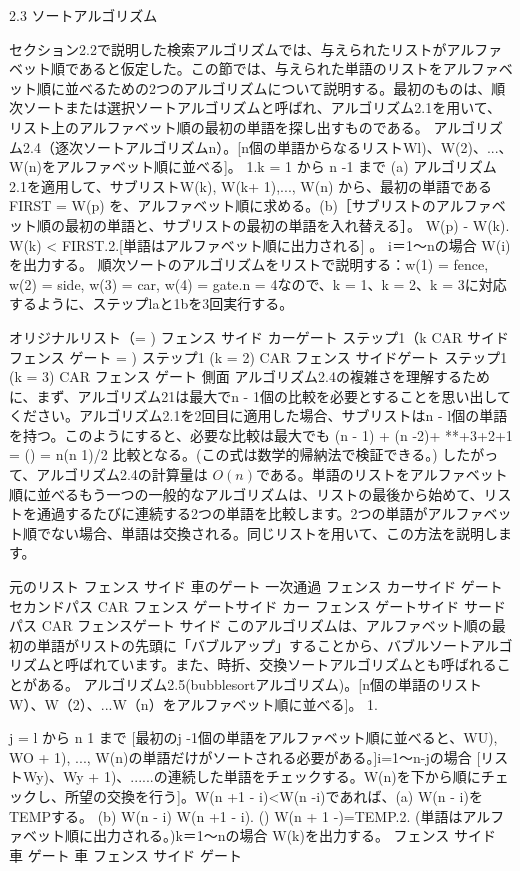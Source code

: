 

2.3 ソートアルゴリズム

セクション2.2で説明した検索アルゴリズムでは、与えられたリストがアルファベット順であると仮定した。この節では、与えられた単語のリストをアルファベット順に並べるための2つのアルゴリズムについて説明する。最初のものは、順次ソートまたは選択ソートアルゴリズムと呼ばれ、アルゴリズム2.1を用いて、リスト上のアルファベット順の最初の単語を探し出すものである。
アルゴリズム2.4（逐次ソートアルゴリズムn）。[n個の単語からなるリストWl)、W(2)、...、W(n)をアルファベット順に並べる]。
1.k = 1 から n -1 まで
(a) アルゴリズム2.1を適用して、サブリストW(k), W(k+ 1),..., W(n) から、最初の単語であるFIRST = W(p) を、アルファベット順に求める。(b)［サブリストのアルファベット順の最初の単語と、サブリストの最初の単語を入れ替える］。
W(p) - W(k).
W(k) < FIRST.2.[単語はアルファベット順に出力される] 。
i＝1〜nの場合
W(i)を出力する。
順次ソートのアルゴリズムをリストで説明する：w(1) = fence, w(2) = side, w(3) = car, w(4) = gate.n = 4なので、k = 1、k = 2、k = 3に対応するように、ステップlaと1bを3回実行する。


オリジナルリスト（= )
フェンス
サイド
カーゲート
ステップ1（k
CAR
サイドフェンス
ゲート
= )
ステップ1 (k = 2)
CAR
フェンス
サイドゲート
ステップ1 (k = 3)
CAR
フェンス
ゲート 側面
アルゴリズム2.4の複雑さを理解するために、まず、アルゴリズム21は最大でn - 1個の比較を必要とすることを思い出してください。アルゴリズム2.1を2回目に適用した場合、サブリストはn - l個の単語を持つ。このようにすると、必要な比較は最大でも (n - 1) + (n -2)+ **+3+2+1 = () = n(n 1)/2 比較となる。(この式は数学的帰納法で検証できる。) したがって、アルゴリズム2.4の計算量は
$O(n)$である。単語のリストをアルファベット順に並べるもう一つの一般的なアルゴリズムは、リストの最後から始めて、リストを通過するたびに連続する2つの単語を比較します。2つの単語がアルファベット順でない場合、単語は交換される。同じリストを用いて、この方法を説明します。

元のリスト
フェンス
サイド
車のゲート
一次通過
フェンス
カーサイド
ゲート
セカンドパス
CAR
フェンス
ゲートサイド
カー
フェンス
ゲートサイド
サードパス
CAR
フェンスゲート
サイド
このアルゴリズムは、アルファベット順の最初の単語がリストの先頭に「バブルアップ」することから、バブルソートアルゴリズムと呼ばれています。また、時折、交換ソートアルゴリズムとも呼ばれることがある。
アルゴリズム2.5(bubblesortアルゴリズム)。[n個の単語のリストW）、W（2）、...W（n）をアルファベット順に並べる]。
1.

j = l から n 1 まで
[最初のj -1個の単語をアルファベット順に並べると、WU), WO + 1), ..., W(n)の単語だけがソートされる必要がある。]i=1〜n-jの場合
[リストWy)、Wy + 1)、......の連続した単語をチェックする。W(n)を下から順にチェックし、所望の交換を行う]。W(n +1 - i)<W(n -i)であれば、(a) W(n - i)をTEMPする。
(b) W(n - i) W(n +1 - i).
() W(n + 1 -)=TEMP.2. (単語はアルファベット順に出力される。)k＝1〜nの場合
W(k)を出力する。
フェンス
サイド
車
ゲート
車
フェンス
サイド
ゲート